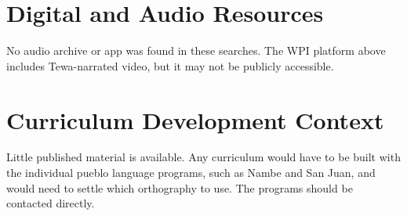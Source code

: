\documentclass[12pt]{article}
\begin{document}
\section{Digital and Audio Resources}
No audio archive or app was found in these searches. The WPI platform above includes Tewa-narrated video, but it may not be publicly accessible.

\section{Curriculum Development Context}
Little published material is available. Any curriculum would have to be built with the individual pueblo language programs, such as Nambe and San Juan, and would need to settle which orthography to use. The programs should be contacted directly.
\end{document}
